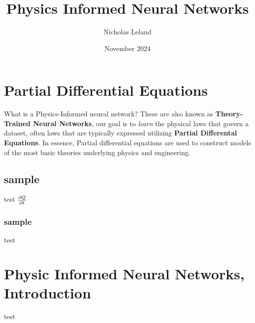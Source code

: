 \documentclass[10pt, oneside]{report}
\title{Physics Informed Neural Networks}
\author{Nicholas Leland}
\date{November 2024}
\begin{document}
\maketitle
\tableofcontents

\vspace{.25in}

\chapter{Partial Differential Equations}
What is a Physics-Informed neural network? These are also known as \textbf{Theory-Trained Neural Networks}, our goal is to \textit{learn} the physical laws that govern a dataset, often laws that are typically expressed utilizing \textbf{Partial Differental Equations}.  
In essence, Partial differential equations are used to construct models of the most basic theories underlying physics and engineering.  



\section{sample}
test
$\pdv{Q}{t}$

\subsection{sample}
test

\chapter{Physic Informed Neural Networks, Introduction}
test
\end{document}
